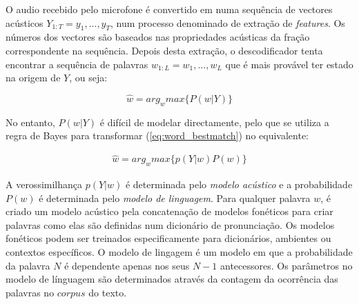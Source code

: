 \documentclass[journal]{IEEEtran}
\begin{document}
O audio recebido pelo microfone é convertido em numa sequência de vectores acústicos $Y_{1:T}=y_1,...,y_T$, num processo denominado de extração de \textit{features}. Os números dos vectores são baseados nas propriedades acústicas da fração correspondente na sequência. Depois desta extração, o descodificador tenta encontrar a sequência de palavras $w_{1:L}=w_1,...,w_L$ que é mais provável ter estado na origem de $Y$, ou seja:

\begin{equation}
\label{eq:word_bestmatch}
  \hat{w}=arg_w max \{ P(w|Y) \}
\end{equation}

No entanto, $P(w|Y)$ é difícil de modelar directamente, pelo que se utiliza a regra de Bayes para transformar (\ref{eq:word_bestmatch})
 no equivalente:

\begin{eqnarray}
  \label{eq:word_bestmatch_equi}
   \hat{w} = arg_w max \{ p(Y|w) P(w) \}
\end{eqnarray}

A verossimilhança $p(Y|w)$ é determinada pelo \emph{modelo acústico} e a probabilidade $P(w)$ é determinada pelo \emph{modelo de linguagem}. Para qualquer palavra $w$, é criado um modelo acústico pela concatenação de modelos fonéticos para criar palavras como elas são definidas num dicionário de pronunciação. Os modelos fonéticos podem ser treinados especificamente para dicionários, ambientes ou contextos específicos. O modelo de lingagem é um modelo em que a probabilidade da palavra $N$ é dependente apenas nos seus $N-1$ antecessores. Os parâmetros no modelo de línguagem são determinados através da contagem da ocorrência das palavras no $corpus$ do texto.

\end{document}
